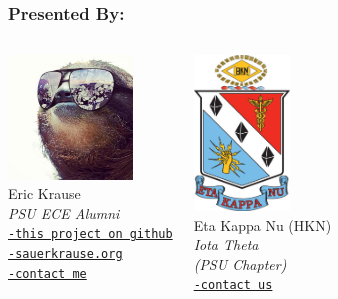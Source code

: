 \documentclass[notes=only]{beamer}
\begin{document}
\begin{frame} \frametitle{Presented By:}
	\begin{columns}[T]
			\begin{center}
				\vspace{.3in}
				\includegraphics[width=1.3in]{Resources/ekrause.jpg}\\
				Eric Krause\\
				\textit{PSU ECE Alumni}\\
				\texttt{\href{https://github.com/ekrause/LaTeX-Presentation}{-this project on github}}\\
				\texttt{\href{https://www.sauerkrause.org}{-sauerkrause.org}}\\
				\texttt{\href{mailto:eric+latex@sauerkrause.org}{-contact me}}
			\end{center}
        	\begin{center}
				\includegraphics[width=1in]{Resources/hkn.png}\\
				Eta Kappa Nu (HKN)\\
				\textit{Iota Theta\\(PSU Chapter)}\\
				\texttt{\href{mailto:cwg2@pdx.edu}{-contact us}}
			\end{center}
			
				
        \end{columns}

\end{frame}
\end{document}
